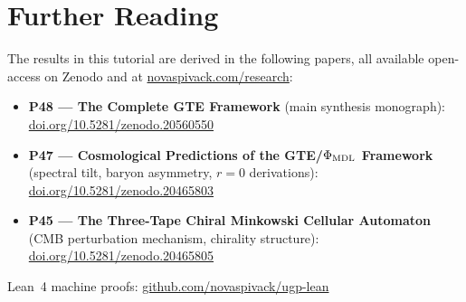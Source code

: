\documentclass[11pt,a4paper]{article}
\begin{document}
\section*{Further Reading}
\begin{tcolorbox}[colback=orange!8,colframe=orange!50!black,
  title=\textbf{Primary Sources}]
The results in this tutorial are derived in the following papers,
all available open-access on Zenodo and at
\href{https://novaspivack.com/research}{novaspivack.com/research}:
\begin{itemize}[itemsep=2pt]
  \item \textbf{P48 --- The Complete GTE Framework} (main synthesis monograph):\\
        \href{https://doi.org/10.5281/zenodo.20560550}{doi.org/10.5281/zenodo.20560550}
  \item \textbf{P47 --- Cosmological Predictions of the GTE/$\Phi_{\rm MDL}$ Framework}
        (spectral tilt, baryon asymmetry, $r = 0$ derivations):\\
        \href{https://doi.org/10.5281/zenodo.20465803}{doi.org/10.5281/zenodo.20465803}
  \item \textbf{P45 --- The Three-Tape Chiral Minkowski Cellular Automaton}
        (CMB perturbation mechanism, chirality structure):\\
        \href{https://doi.org/10.5281/zenodo.20465805}{doi.org/10.5281/zenodo.20465805}
\end{itemize}
Lean~4 machine proofs: \href{https://github.com/novaspivack/ugp-lean}{github.com/novaspivack/ugp-lean}
\end{tcolorbox}



\end{document}
